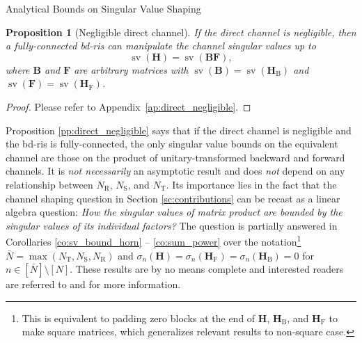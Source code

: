 \documentclass[journal]{IEEEtran}
\DeclareMathOperator{\sv}{sv}
\newtheorem{proposition}{Proposition}
\begin{document}
\begin{section}{Analytical Bounds on Singular Value Shaping}
\begin{proposition}[Negligible direct channel]
			If the direct channel is negligible, then a fully-connected \gls{bd}-\gls{ris} can manipulate the channel singular values up to
			\begin{equation}
				\sv(\mathbf{H}) = \sv(\mathbf{BF}),
				\label{eq:sv_fully_connected}
			\end{equation}
			where $\mathbf{B}$ and $\mathbf{F}$ are arbitrary matrices with $\sv(\mathbf{B})=\sv(\mathbf{H}_\mathrm{B})$ and $\sv(\mathbf{F})=\sv(\mathbf{H}_\mathrm{F})$.
		\end{proposition}

		\begin{proof}
			Please refer to Appendix~\ref{ap:direct_negligible}.
		\end{proof}

		Proposition \ref{pp:direct_negligible} says that if the direct channel is negligible and the \gls{bd}-\gls{ris} is fully-connected, the only singular value bounds on the equivalent channel are those on the product of unitary-transformed backward and forward channels.
		It is \emph{not necessarily} an asymptotic result and does \emph{not} depend on any relationship between $N_\mathrm{R}$, $N_\mathrm{S}$, and $N_\mathrm{T}$.
		Its importance lies in the fact that the channel shaping question in Section \ref{sc:contributions} can be recast as a linear algebra question: \emph{How the singular values of matrix product are bounded by the singular values of its individual factors?}
		The question is partially answered in Corollaries \ref{co:sv_bound_horn} -- \ref{co:sum_power} over the notation\footnote{This is equivalent to padding zero blocks at the end of $\mathbf{H}$, $\mathbf{H}_\mathrm{B}$, and $\mathbf{H}_\mathrm{F}$ to make square matrices, which generalizes relevant results to non-square case.} $\bar{N} = \max(N_\mathrm{T},N_\mathrm{S},N_\mathrm{R})$ and $\sigma_n(\mathbf{H})=\sigma_n(\mathbf{H}_\mathrm{F})=\sigma_n(\mathbf{H}_\mathrm{B})=0$ for $n \in [\bar{N}] \setminus [N]$.
		These results are by no means complete and interested readers are referred to \cite[Chapter 16, 24]{Hogben2013} and \cite[Chapter 3]{Horn1994} for more information.



\end{section}
\end{document}
